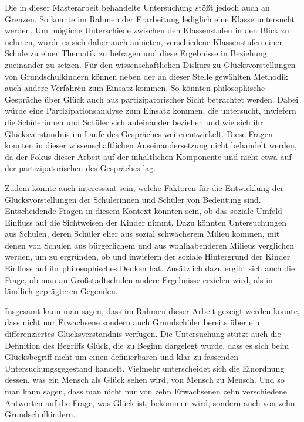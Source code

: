 Die in dieser Masterarbeit behandelte Untersuchung stößt jedoch auch an Grenzen. 
So konnte im Rahmen der Erarbeitung lediglich eine Klasse untersucht werden. 
Um mögliche Unterschiede zwischen den Klassenstufen in den Blick zu nehmen, würde es sich daher auch anbieten, verschiedene Klassenstufen einer Schule zu einer Thematik zu befragen und diese Ergebnisse in Beziehung zueinander zu setzen.
Für den wissenschaftlichen Diskurs zu Glücksvorstellungen von Grundschulkindern können neben der an dieser Stelle gewählten Methodik auch andere Verfahren zum Einsatz kommen. 
So könnten philosophische Gespräche über Glück auch aus partizipatorischer Sicht betrachtet werden. 
Dabei würde  eine Partizipationsanalyse zum Einsatz kommen, die untersucht, inwiefern die Schülerinnen und Schüler sich aufeinander beziehen und wie sich ihr Glücksverständnis im Laufe des Gespräches weiterentwickelt. 
Diese Fragen konnten in dieser wissenschaftlichen Auseinandersetzung nicht behandelt werden, da der Fokus dieser Arbeit auf der inhaltlichen Komponente und nicht etwa auf der partizipatorischen des Gespräches lag. 

Zudem könnte auch interessant sein, welche Faktoren für die Entwicklung der Glücksvorstellungen der Schülerinnen und Schüler von Bedeutung sind. 
Entscheidende Fragen in diesem Kontext könnten sein, ob das soziale Umfeld Einfluss auf die Sichtweisen der Kinder nimmt. 
Dazu könnten Untersuchungen aus Schulen, deren Schüler eher aus sozial schwächerem Milieu kommen, mit denen von Schulen aus bürgerlichem und aus wohlhabenderen Milieus verglichen werden, um zu ergründen, ob und inwiefern der soziale Hintergrund der Kinder Einfluss auf ihr philosophisches Denken hat.
Zusätzlich dazu ergibt sich auch die Frage, ob man an Großstadtschulen andere Ergebnisse erzielen wird, als in ländlich geprägteren Gegenden.

Insgesamt kann man sagen, dass im Rahmen dieser Arbeit gezeigt werden konnte, dass nicht nur Erwachsene sondern auch Grundschüler bereits über ein differenziertes Glücksverständnis verfügen.
Die Untersuchung stützt auch die Definition des Begriffs \glqq Glück\grqq{}, die zu Beginn dargelegt wurde, dass es sich beim Glücksbegriff nicht um einen definierbaren und klar zu fassenden Untersuchungsgegestand handelt.
Vielmehr unterscheidet sich die Einordnung dessen, was ein Mensch als Glück sehen wird, von Mensch zu Mensch.
Und so man kann sagen, dass man nicht nur von zehn Erwachsenen zehn verschiedene Antworten auf die Frage, was Glück ist, bekommen wird, sondern auch von zehn Grundschulkindern.
